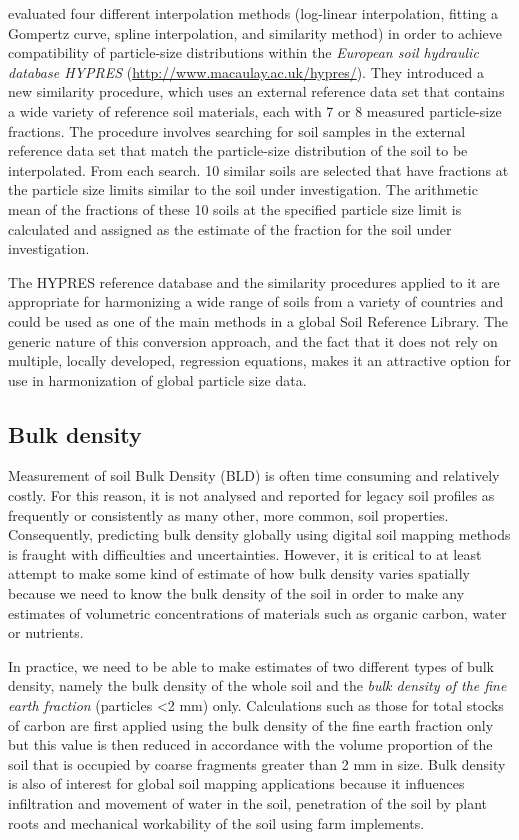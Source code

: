 \documentclass[graybox,natbib,nospthms,UStrade]{svmono}
\begin{document}
\citeauthor{Nemes1999} \citetext{\citeyear{Nemes1999}; \citealp{Nemes1999G}} evaluated four different interpolation methods
(log-linear interpolation, fitting a Gompertz curve, spline
interpolation, and similarity method) in order to achieve compatibility
of particle-size distributions within the \emph{European soil hydraulic
database HYPRES} (\url{http://www.macaulay.ac.uk/hypres/}). They introduced a new similarity procedure, which
uses an external reference data set that contains a wide variety of
reference soil materials, each with 7 or 8 measured particle-size
fractions. The procedure involves searching for soil samples in the
external reference data set that match the particle-size distribution of
the soil to be interpolated. From each search. 10 similar soils are
selected that have fractions at the particle size limits similar to the
soil under investigation. The arithmetic mean of the fractions of these
10 soils at the specified particle size limit is calculated and assigned
as the estimate of the fraction for the soil under investigation.

The HYPRES reference database and the similarity procedures applied to
it are appropriate for harmonizing a wide range of soils from a variety
of countries and could be used as one of the main methods in a global
Soil Reference Library. The generic nature of this conversion approach,
and the fact that it does not rely on multiple, locally developed,
regression equations, makes it an attractive option for use in harmonization of global
particle size data.

\hypertarget{bulk-density}{%
\subsection{Bulk density}\label{bulk-density}}

Measurement of soil Bulk Density (BLD) is often time consuming and
relatively costly. For this reason, it is not analysed and reported for
legacy soil profiles as frequently or consistently as many other, more
common, soil properties. Consequently, predicting bulk density globally
using digital soil mapping methods is fraught with difficulties and
uncertainties. However, it is critical to at least attempt to make some
kind of estimate of how bulk density varies spatially because we need to
know the bulk density of the soil in order to make any estimates of
volumetric concentrations of materials such as organic carbon, water or
nutrients.

In practice, we need to be able to make estimates of two different types
of bulk density, namely the bulk density of the whole soil and the \emph{bulk
density of the fine earth fraction} (particles \textless{}2 mm) only. Calculations
such as those for total stocks of carbon are first applied using the
bulk density of the fine earth fraction only but this value is then
reduced in accordance with the volume proportion of the soil that is
occupied by coarse fragments greater than 2 mm in size. Bulk density is also
of interest for global soil mapping applications because it influences
infiltration and movement of water in the soil, penetration of the soil
by plant roots and mechanical workability of the soil using farm
implements.
\end{document}

